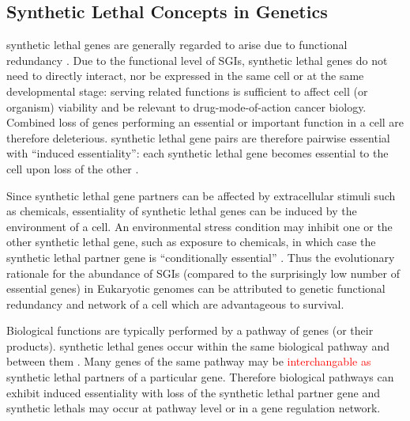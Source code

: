\subsection{Synthetic Lethal Concepts in Genetics}

\Gls{synthetic lethal} genes are generally regarded to arise due to \gls{functional redundancy} \citep{Boone2007}. Due to the functional level of \glspl{SGI}, \gls{synthetic lethal} genes do not need to directly interact, nor be expressed in the same cell or at the same developmental stage: serving related functions is sufficient to affect cell (or organism) viability and be relevant to drug-mode-of-action cancer biology. Combined loss of genes performing an \gls{essential} or important function in a cell are therefore deleterious. \Gls{synthetic lethal} gene pairs are therefore pairwise \gls{essential} with ``\gls{induced essentiality}'': each \gls{synthetic lethal} gene becomes \gls{essential} to the cell upon loss of the other \citep{Kaelin2005, Ashworth2011}.

Since \gls{synthetic lethal} gene partners can be affected by extracellular stimuli such as chemicals, essentiality of \gls{synthetic lethal} genes can be induced by the environment of a cell.  An environmental stress condition may inhibit one or the other \gls{synthetic lethal} gene, such as exposure to chemicals, in which case the \gls{synthetic lethal} partner gene is ``conditionally essential'' \citep{Hillenmeyer2008}. Thus the evolutionary rationale for the abundance of \glspl{SGI} (compared to the surprisingly low number of \gls{essential} genes) in Eukaryotic \glspl{genome} can be attributed to genetic \gls{functional redundancy} and network  of a cell which are advantageous to survival. 

Biological functions are typically performed by a \gls{pathway} of genes (or their products). \Gls{synthetic lethal} genes occur within the same biological \gls{pathway} and between them \citep{Kelley2005, Boone2007, Costanzo2010}. Many genes of the same \gls{pathway} may be \textcolor{red}{interchangable as} \gls{synthetic lethal} partners of a particular gene. Therefore biological \glspl{pathway} can exhibit \gls{induced essentiality} with loss of the \gls{synthetic lethal} partner gene and \glspl{synthetic lethal} may occur at \gls{pathway} level or in a gene regulation network. 


